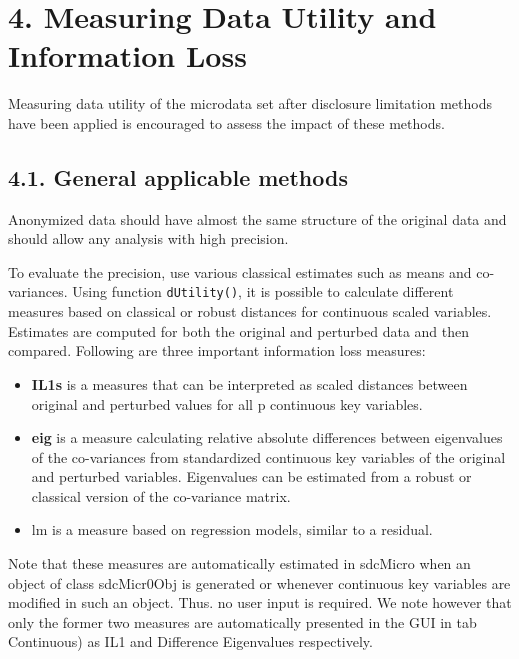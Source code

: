 \documentclass[]{article}
\title{}
\author{}
\begin{document}
\section*{4. Measuring Data Utility and Information Loss}
Measuring data utility of the microdata set after disclosure limitation methods
have been applied is encouraged to assess the impact of these methods.

\subsection*{4.1. General applicable methods}
Anonymized data should have almost the same structure of the original data and
should allow any analysis with high precision.

To evaluate the precision, use various classical estimates such as means and co-
variances. Using function \texttt{dUtility()}, it is possible to calculate different measures
based on classical or robust distances for continuous scaled variables. Estimates are
computed for both the original and perturbed data and then compared. Following
are three important information loss measures:

\begin{itemize}
\item \textbf{IL1s} is a measures that can be interpreted as scaled distances
between original and perturbed values for all p continuous key variables.

\item \textbf{eig} is a measure calculating relative absolute differences between eigenvalues
of the co-variances from standardized continuous key variables of the original
and perturbed variables. Eigenvalues can be estimated from a robust or
classical version of the co-variance matrix.
\item lm is a measure based on regression models, similar to a residual.
\end{itemize}
Note that these measures are automatically estimated in sdcMicro when an
object of class sdcMicr0Obj is generated or whenever continuous key variables are
modiﬁed in such an object. Thus. no user input is required. We note however
that only the former two measures are automatically presented in the GUI in tab
Continuous) as IL1 and Difference Eigenvalues respectively.
\newpage
\end{document}
